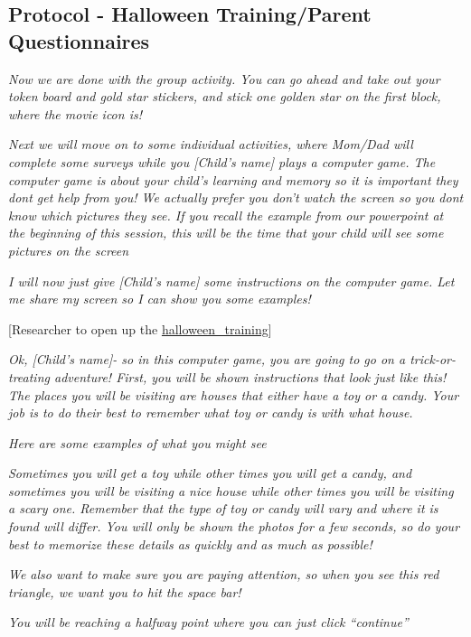 \documentclass[]{book}
\begin{document}
\hypertarget{protocol---halloween-trainingparent-questionnaires}{%
\subsection{Protocol - Halloween Training/Parent Questionnaires}\label{protocol---halloween-trainingparent-questionnaires}}

\emph{Now we are done with the group activity. You can go ahead and take out your token board and gold star stickers, and stick one golden star on the first block, where the movie icon is!}

\emph{Next we will move on to some individual activities, where Mom/Dad will complete some surveys while you {[}Child's name{]} plays a computer game. The computer game is about your child's learning and memory so it is important they dont get help from you! We actually prefer you don't watch the screen so you dont know which pictures they see. If you recall the example from our powerpoint at the beginning of this session, this will be the time that your child will see some pictures on the screen}

\emph{I will now just give {[}Child's name{]} some instructions on the computer game. Let me share my screen so I can show you some examples!}

{[}Researcher to open up the \href{https://ucla.app.box.com/file/709481066655}{halloween\_training}{]}

\emph{Ok, {[}Child's name{]}- so in this computer game, you are going to go on a trick-or-treating adventure! First, you will be shown instructions that look just like this! The places you will be visiting are houses that either have a toy or a candy. Your job is to do their best to remember what toy or candy is with what house.}

\emph{Here are some examples of what you might see}

\emph{Sometimes you will get a toy while other times you will get a candy, and sometimes you will be visiting a nice house while other times you will be visiting a scary one. Remember that the type of toy or candy will vary and where it is found will differ. You will only be shown the photos for a few seconds, so do your best to memorize these details as quickly and as much as possible!}

\emph{We also want to make sure you are paying attention, so when you see this red triangle, we want you to hit the space bar!}

\emph{You will be reaching a halfway point where you can just click ``continue''}
\end{document}
